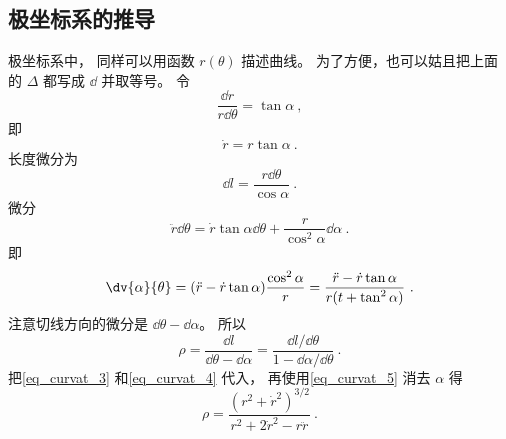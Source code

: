 \subsection{极坐标系的推导}
极坐标系中， 同样可以用函数 $r(\theta)$ 描述曲线。 为了方便，也可以姑且把上面的 $\Delta$ 都写成 $\dd{}$ 并取等号。 令
\begin{equation}
\frac{\dd{r}}{r \dd{\theta}} = \tan\alpha~,
\end{equation}
即
\begin{equation}\label{eq_curvat_5}
\dot r = r\tan\alpha~.
\end{equation}
长度微分为
\begin{equation}
\dd{l} = \frac{r\dd{\theta}}{\cos\alpha}~.
\end{equation}
微分
\begin{equation}
\ddot r\dd{\theta} = \dot r\tan\alpha\dd{\theta} + \frac{r}{\cos^2\alpha}\dd{\alpha}~.
\end{equation}
即
\begin{equation}\label{eq_curvat_4}
\dv{\alpha}{\theta} = (\ddot r - \dot r \tan\alpha) \frac{\cos^2\alpha}{r} = \frac{\ddot r - \dot r\tan\alpha}{r(t + \tan^2\alpha)}~.
\end{equation}
注意切线方向的微分是 $\dd{\theta} - \dd{\alpha}$。 所以
\begin{equation}
\rho = \frac{\dd{l}}{\dd{\theta} - \dd{\alpha}} = \frac{\dd{l}/\dd{\theta}}{1 - \dd{\alpha}/\dd{\theta}}~.
\end{equation}
把\autoref{eq_curvat_3} 和\autoref{eq_curvat_4} 代入， 再使用\autoref{eq_curvat_5} 消去 $\alpha$ 得
\begin{equation}
\rho = \frac{(r^2 + \dot r^2)^{3/2}}{r^2 + 2\dot r^2 - r\ddot r}~.
\end{equation}
